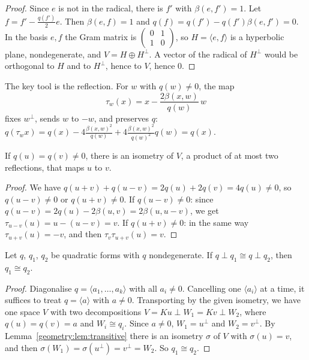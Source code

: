 \begin{proof}
Since $e$ is not in the radical, there is $f'$ with $\beta(e,f')=1$. Let $f=f'-\frac{q(f')}2e$. Then $\beta(e,f)=1$ and
$q(f)=q(f')-q(f')\beta(e,f')=0$. In the basis $e,f$ the Gram matrix is $\begin{pmatrix}0&1\\1&0\end{pmatrix}$, so $H=\langle e,f\rangle$ is a hyperbolic plane,
nondegenerate, and $V=H\oplus H^\perp$. A vector of the radical of $H^\perp$ would be orthogonal to $H$ and to $H^\perp$, hence to $V$, hence $0$.
\end{proof}

The key tool is the reflection. For $w$ with $q(w)\ne0$, the map
\[
\tau_w(x)=x-\frac{2\beta(x,w)}{q(w)}\,w
\]
fixes $w^\perp$, sends $w$ to $-w$, and preserves $q$: $q(\tau_wx)=q(x)-4\frac{\beta(x,w)^2}{q(w)}+4\frac{\beta(x,w)^2}{q(w)^2}q(w)=q(x)$.

\begin{lemma}\label{geometry:lem:transitive}
If $q(u)=q(v)\ne0$, there is an isometry of $V$, a product of at most two reflections, that maps $u$ to $v$.
\end{lemma}

\begin{proof}
We have $q(u+v)+q(u-v)=2q(u)+2q(v)=4q(u)\ne0$, so $q(u-v)\ne0$ or $q(u+v)\ne0$. If $q(u-v)\ne0$: since $q(u-v)=2q(u)-2\beta(u,v)=2\beta(u,u-v)$, we get
$\tau_{u-v}(u)=u-(u-v)=v$. If $q(u+v)\ne0$: in the same way $\tau_{u+v}(u)=-v$, and then $\tau_v\tau_{u+v}(u)=v$.
\end{proof}

\begin{theorem}\label{geometry:thm:witt}
Let $q$, $q_1$, $q_2$ be quadratic forms with $q$ nondegenerate. If $q\perp q_1\cong q\perp q_2$, then $q_1\cong q_2$.
\end{theorem}

\begin{proof}
Diagonalise $q=\langle a_1,\dots,a_k\rangle$ with all $a_i\ne0$. Cancelling one $\langle a_i\rangle$ at a time, it suffices to treat $q=\langle a\rangle$
with $a\ne0$. Transporting by the given isometry, we have one space $V$ with two decompositions $V=Ku\perp W_1=Kv\perp W_2$, where $q(u)=q(v)=a$ and
$W_i\cong q_i$. Since $a\ne0$, $W_1=u^\perp$ and $W_2=v^\perp$. By Lemma~\ref{geometry:lem:transitive} there is an isometry $\sigma$ of $V$ with $\sigma(u)=v$, and
then $\sigma(W_1)=\sigma(u^\perp)=v^\perp=W_2$. So $q_1\cong q_2$.
\end{proof}


